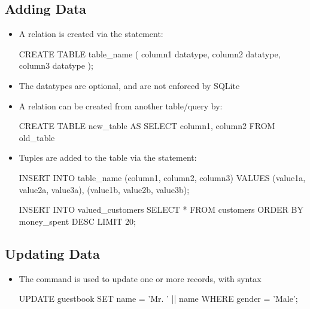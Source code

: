\documentclass[a4paper]{article}
\begin{document}
\subsection{Adding Data}
\begin{itemize}
    \item A relation is created via the  statement:
\begin{sql}
CREATE TABLE table_name (
    column1 datatype,
    column2 datatype,
    column3 datatype
);
\end{sql}
    \item The datatypes are optional, and are not enforced by SQLite
    \item A relation can be created from another table/query by:
    \begin{sql}
CREATE TABLE new_table AS
SELECT column1, column2
FROM old_table
\end{sql}
\item Tuples are added to the table via the  statement:
    \begin{sql}
INSERT INTO table_name (column1, column2, column3)
VALUES (value1a, value2a, value3a),
       (value1b, value2b, value3b);
\end{sql}
\begin{sql}
INSERT INTO valued_customers
SELECT * FROM customers
ORDER BY money_spent DESC
LIMIT 20;
\end{sql}
\end{itemize}

\subsection{Updating Data}
\begin{itemize}
    \item The  command is used to update one or more records, with syntax 
\begin{sql}
UPDATE guestbook
SET name = 'Mr. ' || name
WHERE gender = 'Male';
\end{sql}
\end{itemize}
\end{document}
